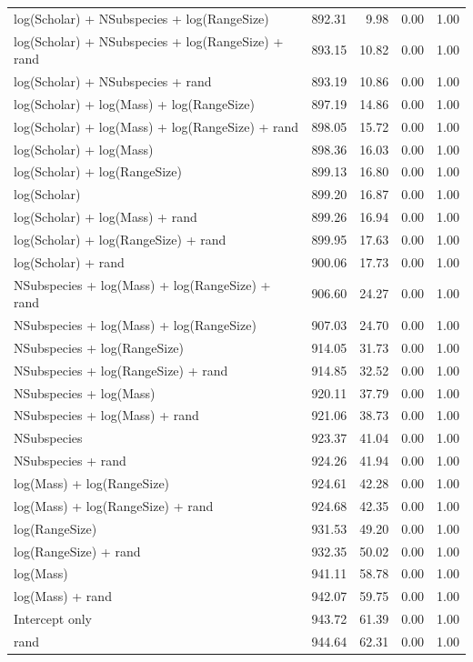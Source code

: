 \begin{table}[ht]
\begin{tabular}{@{}lrrrr@{}}
  log(Scholar) + NSubspecies + log(RangeSize) & 892.31 & 9.98 & 0.00 & 1.00 \\ 
  log(Scholar) + NSubspecies + log(RangeSize) + rand & 893.15 & 10.82 & 0.00 & 1.00 \\ 
  log(Scholar) + NSubspecies + rand & 893.19 & 10.86 & 0.00 & 1.00 \\ 
  log(Scholar) + log(Mass) + log(RangeSize) & 897.19 & 14.86 & 0.00 & 1.00 \\ 
  log(Scholar) + log(Mass) + log(RangeSize) + rand & 898.05 & 15.72 & 0.00 & 1.00 \\ 
  log(Scholar) + log(Mass) & 898.36 & 16.03 & 0.00 & 1.00 \\ 
  log(Scholar) + log(RangeSize) & 899.13 & 16.80 & 0.00 & 1.00 \\ 
  log(Scholar) & 899.20 & 16.87 & 0.00 & 1.00 \\ 
  log(Scholar) + log(Mass) + rand & 899.26 & 16.94 & 0.00 & 1.00 \\ 
  log(Scholar) + log(RangeSize) + rand & 899.95 & 17.63 & 0.00 & 1.00 \\ 
  log(Scholar) + rand & 900.06 & 17.73 & 0.00 & 1.00 \\ 
  NSubspecies + log(Mass) + log(RangeSize) + rand & 906.60 & 24.27 & 0.00 & 1.00 \\ 
  NSubspecies + log(Mass) + log(RangeSize) & 907.03 & 24.70 & 0.00 & 1.00 \\ 
  NSubspecies + log(RangeSize) & 914.05 & 31.73 & 0.00 & 1.00 \\ 
  NSubspecies + log(RangeSize) + rand & 914.85 & 32.52 & 0.00 & 1.00 \\ 
  NSubspecies + log(Mass) & 920.11 & 37.79 & 0.00 & 1.00 \\ 
  NSubspecies + log(Mass) + rand & 921.06 & 38.73 & 0.00 & 1.00 \\ 
  NSubspecies & 923.37 & 41.04 & 0.00 & 1.00 \\ 
  NSubspecies + rand & 924.26 & 41.94 & 0.00 & 1.00 \\ 
  log(Mass) + log(RangeSize) & 924.61 & 42.28 & 0.00 & 1.00 \\ 
  log(Mass) + log(RangeSize) + rand & 924.68 & 42.35 & 0.00 & 1.00 \\ 
  log(RangeSize) & 931.53 & 49.20 & 0.00 & 1.00 \\ 
  log(RangeSize) + rand & 932.35 & 50.02 & 0.00 & 1.00 \\ 
  log(Mass) & 941.11 & 58.78 & 0.00 & 1.00 \\ 
  log(Mass) + rand & 942.07 & 59.75 & 0.00 & 1.00 \\ 
  Intercept only & 943.72 & 61.39 & 0.00 & 1.00 \\ 
  rand & 944.64 & 62.31 & 0.00 & 1.00 \\ 
   \bottomrule
\end{tabular}
\endgroup
\end{table}




